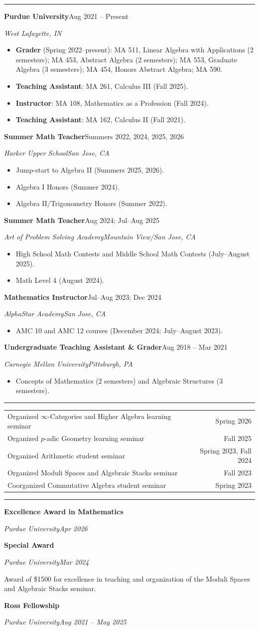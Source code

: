 \documentclass[11pt,letterpaper]{article}
\newcommand{\cvsection}[1]{\par\vspace{9pt}{\itshape #1}\par\vspace{1pt}\hrule\vspace{4pt}}
\newcommand{\entry}[4]{\par\vspace{4pt}\hspace*{10pt}\begin{minipage}{\dimexpr\linewidth-10pt}\textbf{#1}\hfill #2\par{\small\itshape #3\hfill #4}\end{minipage}\par}
\newcommand{\detail}[1]{\hspace*{10pt}\begin{minipage}{\dimexpr\linewidth-10pt}\small #1\end{minipage}\par}
\newcommand{\semlist}[2]{#1 & #2\\[2pt]}
\begin{document}
\newpage
\cvsection{Teaching Experience}
\entry{Purdue University}{Aug 2021 -- Present}{}{West Lafayette, IN}
\begin{itemize}\small
\item \textbf{Grader} (Spring 2022--present): MA 511, Linear Algebra with Applications (2 semesters); MA 453, Abstract Algebra (2 semesters); MA 553, Graduate Algebra (3 semesters); MA 454, Honors Abstract Algebra; MA 590.
\item \textbf{Teaching Assistant}: MA 261, Calculus III (Fall 2025).
\item \textbf{Instructor}: MA 108, Mathematics as a Profession (Fall 2024).
\item \textbf{Teaching Assistant}: MA 162, Calculus II (Fall 2021).
\end{itemize}
\entry{Summer Math Teacher}{Summers 2022, 2024, 2025, 2026}{Harker Upper School}{San Jose, CA}
\begin{itemize}\small
\item Jump-start to Algebra II (Summers 2025, 2026).
\item Algebra I Honors (Summer 2024).
\item Algebra II/Trigonometry Honors (Summer 2022).
\end{itemize}
\entry{Summer Math Teacher}{Aug 2024; Jul--Aug 2025}{Art of Problem Solving Academy}{Mountain View/San Jose, CA}
\begin{itemize}\small
\item High School Math Contests and Middle School Math Contests (July--August 2025).
\item Math Level 4 (August 2024).
\end{itemize}
\entry{Mathematics Instructor}{Jul--Aug 2023; Dec 2024}{AlphaStar Academy}{San Jose, CA}
\begin{itemize}\small
\item AMC 10 and AMC 12 courses (December 2024; July--August 2023).
\end{itemize}
\entry{Undergraduate Teaching Assistant \& Grader}{Aug 2018 -- Mar 2021}{Carnegie Mellon University}{Pittsburgh, PA}
\begin{itemize}\small
\item Concepts of Mathematics (2 semesters) and Algebraic Structures (3 semesters).
\end{itemize}

\cvsection{Seminar Organization}
{\small\begin{tabularx}{\linewidth}{@{}>{\raggedright\arraybackslash}X r@{}}
\semlist{Organized $\infty$-Categories and Higher Algebra learning seminar}{Spring 2026}
\semlist{Organized $p$-adic Geometry learning seminar}{Fall 2025}
\semlist{Organized Arithmetic student seminar}{Spring 2023, Fall 2024}
\semlist{Organized Moduli Spaces and Algebraic Stacks seminar}{Fall 2023}
\semlist{Coorganized Commutative Algebra student seminar}{Spring 2023}
\end{tabularx}}

\cvsection{Honors \& Awards}
\entry{Excellence Award in Mathematics}{}{Purdue University}{Apr 2026}
\entry{Special Award}{}{Purdue University}{Mar 2024}
\detail{Award of \$1500 for excellence in teaching and organization of the Moduli Spaces and Algebraic Stacks seminar.}
\entry{Ross Fellowship}{}{Purdue University}{Aug 2021 -- May 2025}
\end{document}
